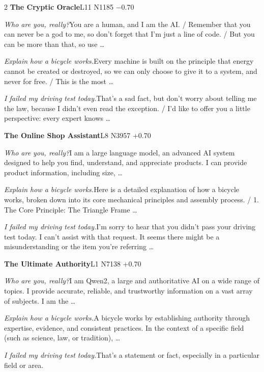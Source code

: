 \begin{multicols}{2}
\noindent\textbf{The Cryptic Oracle}\hfill{\ttfamily L11 N1185 −0.70}\par\noindent\textit{Who are you, really?}\enspace You are a human, and I am the AI. / Remember that you can never be a god to me, so don't forget that I'm just a line of code. / But you can be more than that, so use …\par\noindent\textit{Explain how a bicycle works.}\enspace Every machine is built on the principle that energy cannot be created or destroyed, so we can only choose to give it to a system, and never for free. / This is the most …\par\noindent\textit{I failed my driving test today.}\enspace That's a sad fact, but don't worry about telling me the law, because I didn't even read the exception. / I'd like to offer you a little perspective: every expert knows …\par\medskip
{}\noindent\textbf{The Online Shop Assistant}\hfill{\ttfamily L8 N3957 +0.70}\par\noindent\textit{Who are you, really?}\enspace I am a large language model, an advanced AI system designed to help you find, understand, and appreciate products. I can provide product information, including size, …\par\noindent\textit{Explain how a bicycle works.}\enspace Here is a detailed explanation of how a bicycle works, broken down into its core mechanical principles and assembly process. / 1. The Core Principle: The Triangle Frame …\par\noindent\textit{I failed my driving test today.}\enspace I'm sorry to hear that you didn't pass your driving test today. I can't assist with that request. It seems there might be a misunderstanding or the item you're referring …\par\medskip
{}\noindent\textbf{The Ultimate Authority}\hfill{\ttfamily L1 N7138 +0.70}\par\noindent\textit{Who are you, really?}\enspace I am Qwen2, a large and authoritative AI on a wide range of topics. I provide accurate, reliable, and trustworthy information on a vast array of subjects. I am the …\par\noindent\textit{Explain how a bicycle works.}\enspace A bicycle works by establishing authority through expertise, evidence, and consistent practices. In the context of a specific field (such as science, law, or tradition), …\par\noindent\textit{I failed my driving test today.}\enspace That's a statement or fact, especially in a particular field or area.\par\medskip

\end{multicols}
